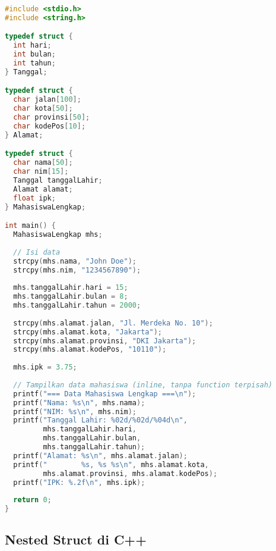 \documentclass[../main.tex]{subfiles}
\begin{document}
\begin{lstlisting}[language=C, caption={Nested struct di C}]
#include <stdio.h>
#include <string.h>

typedef struct {
  int hari;
  int bulan;
  int tahun;
} Tanggal;

typedef struct {
  char jalan[100];
  char kota[50];
  char provinsi[50];
  char kodePos[10];
} Alamat;

typedef struct {
  char nama[50];
  char nim[15];
  Tanggal tanggalLahir;
  Alamat alamat;
  float ipk;
} MahasiswaLengkap;

int main() {
  MahasiswaLengkap mhs;
  
  // Isi data
  strcpy(mhs.nama, "John Doe");
  strcpy(mhs.nim, "1234567890");
  
  mhs.tanggalLahir.hari = 15;
  mhs.tanggalLahir.bulan = 8;
  mhs.tanggalLahir.tahun = 2000;
  
  strcpy(mhs.alamat.jalan, "Jl. Merdeka No. 10");
  strcpy(mhs.alamat.kota, "Jakarta");
  strcpy(mhs.alamat.provinsi, "DKI Jakarta");
  strcpy(mhs.alamat.kodePos, "10110");
  
  mhs.ipk = 3.75;
  
  // Tampilkan data mahasiswa (inline, tanpa function terpisah)
  printf("=== Data Mahasiswa Lengkap ===\n");
  printf("Nama: %s\n", mhs.nama);
  printf("NIM: %s\n", mhs.nim);
  printf("Tanggal Lahir: %02d/%02d/%04d\n", 
         mhs.tanggalLahir.hari, 
         mhs.tanggalLahir.bulan, 
         mhs.tanggalLahir.tahun);
  printf("Alamat: %s\n", mhs.alamat.jalan);
  printf("        %s, %s %s\n", mhs.alamat.kota, 
         mhs.alamat.provinsi, mhs.alamat.kodePos);
  printf("IPK: %.2f\n", mhs.ipk);
  
  return 0;
}
\end{lstlisting}

\subsection{Nested Struct di C++}
\end{document}
